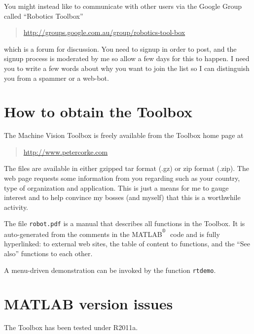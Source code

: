 \documentclass[a4paper]{report}
\def\Mlab{MATLAB$^{\textsuperscript{\textregistered}}$}
\begin{document}
You might instead like to communicate with other users via 
the Google Group called ``Robotics Toolbox'' 
\begin{quote}
\url{http://groups.google.com.au/group/robotics-tool-box}
\end{quote}
which is a forum for discussion.
You need to signup in order to post, and the signup process is moderated by me so allow a few
days for this to happen.  I need you to write a few words about why you want to join the list
so I can distinguish you from a spammer or a web-bot.

\section{How to obtain the Toolbox}
The Machine Vision Toolbox is freely available from the Toolbox home
page at 
\begin{quote}
\url{http://www.petercorke.com}
\end{quote}

The files are available in either gzipped tar format (.gz) or zip
format (.zip).  The web page requests some information from you
regarding such as your country, type of organization and application.
This is just a means for me to gauge interest and to help convince my
bosses (and myself) that this is a worthwhile activity.

The file {\tt robot.pdf} is a manual that describes all functions in the Toolbox.
It is auto-generated from the comments in the \Mlab\ code and is fully hyperlinked:
to external web sites, the table of content to functions, and the ``See also'' functions
to each other.

A menu-driven demonstration can be invoked by the function {\tt rtdemo}.

\section{MATLAB version issues}
The Toolbox has been tested under R2011a.
\end{document}
